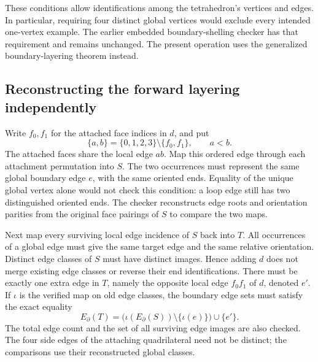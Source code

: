 These conditions allow identifications among the tetrahedron's vertices
and edges.  In particular, requiring four distinct global vertices would
exclude every intended one-vertex example.  The earlier embedded
boundary-shelling checker has that requirement and remains unchanged.
The present operation uses the generalized boundary-layering theorem
instead.

\subsection{Reconstructing the forward layering independently}

Write $f_0,f_1$ for the attached face indices in $d$, and put
\[
 \{a,b\}=\{0,1,2,3\}\setminus\{f_0,f_1\},\qquad a<b.
\]
The attached faces share the local edge $ab$.  Map this ordered edge
through each attachment permutation into $S$.  The two occurrences
must represent the same global boundary edge $e$, with the same
oriented ends.  Equality of the unique global vertex alone would not
check this condition: a loop edge still has two distinguished oriented
ends.  The checker reconstructs edge roots and orientation parities
from the original face pairings of $S$ to compare the two maps.

Next map every surviving local edge incidence of $S$ back into $T$.
All occurrences of a global edge must give the same target edge and
the same relative orientation.  Distinct edge classes of $S$ must have
distinct images.  Hence adding $d$ does not merge existing edge classes
or reverse their end identifications.  There must be exactly one extra
edge in $T$, namely the opposite local edge $f_0f_1$ of $d$, denoted
$e'$.  If $\iota$ is the verified map on old edge classes, the boundary
edge sets must satisfy the exact equality
\[
 E_\partial(T)
   =\bigl(\iota(E_\partial(S))\setminus\{\iota(e)\}\bigr)
       \cup\{e'\}.
\]
The total edge count and the set of all surviving edge images are also
checked.  The four side edges of the attaching quadrilateral need not
be distinct; the comparisons use their reconstructed global classes.

